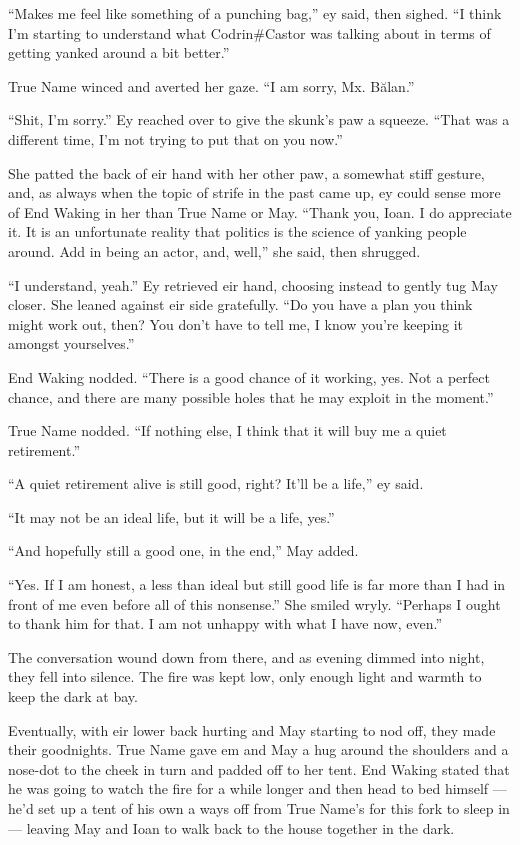 ``Makes me feel like something of a punching bag,'' ey said, then sighed. ``I think I'm starting to understand what Codrin\#Castor was talking about in terms of getting yanked around a bit better.''

True Name winced and averted her gaze. ``I am sorry, Mx. Bălan.''

``Shit, I'm sorry.'' Ey reached over to give the skunk's paw a squeeze. ``That was a different time, I'm not trying to put that on you now.''

She patted the back of eir hand with her other paw, a somewhat stiff gesture, and, as always when the topic of strife in the past came up, ey could sense more of End Waking in her than True Name or May. ``Thank you, Ioan. I do appreciate it. It is an unfortunate reality that politics is the science of yanking people around. Add in being an actor, and, well,'' she said, then shrugged.

``I understand, yeah.'' Ey retrieved eir hand, choosing instead to gently tug May closer. She leaned against eir side gratefully. ``Do you have a plan you think might work out, then? You don't have to tell me, I know you're keeping it amongst yourselves.''

End Waking nodded. ``There is a good chance of it working, yes. Not a perfect chance, and there are many possible holes that he may exploit in the moment.''

True Name nodded. ``If nothing else, I think that it will buy me a quiet retirement.''

``A quiet retirement alive is still good, right? It'll be a life,'' ey said.

``It may not be an ideal life, but it will be a life, yes.''

``And hopefully still a good one, in the end,'' May added.

``Yes. If I am honest, a less than ideal but still good life is far more than I had in front of me even before all of this nonsense.'' She smiled wryly. ``Perhaps I ought to thank him for that. I am not unhappy with what I have now, even.''

The conversation wound down from there, and as evening dimmed into night, they fell into silence. The fire was kept low, only enough light and warmth to keep the dark at bay.

Eventually, with eir lower back hurting and May starting to nod off, they made their goodnights. True Name gave em and May a hug around the shoulders and a nose-dot to the cheek in turn and padded off to her tent. End Waking stated that he was going to watch the fire for a while longer and then head to bed himself — he'd set up a tent of his own a ways off from True Name's for this fork to sleep in — leaving May and Ioan to walk back to the house together in the dark.

